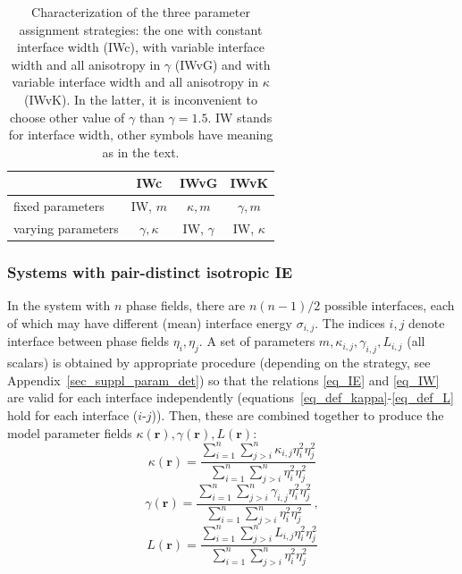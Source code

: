	\begin{table}[h]
		\centering
		\caption[PF model - characterization of the three parameter assignment strategies]{Characterization of the three parameter assignment strategies: the one with constant interface width (IWc), with variable interface width and all anisotropy in $\gamma$ (IWvG) and with variable interface width and all anisotropy in $\kappa$ (IWvK). In the latter, it is inconvenient to choose other value of $\gamma$ than $\gamma=1.5$. IW stands for interface width, other symbols have meaning as in the text.}
		\label{tab_models_comparison}
		\begin{tabular}{l|c|c|c|}\footnotesize
			& IWc & IWvG & IWvK \\ \hline
			fixed parameters & IW, $m$ & $\kappa, m$ & $\gamma, m$  \\
			varying parameters & $\gamma, \kappa$ & IW, $\gamma$ & IW, $\kappa$
		\end{tabular}
	\end{table}

		\subsubsection{Systems with pair-distinct isotropic IE}
		In the system with $n$ phase fields, there are $n(n-1)/2$ possible interfaces, each of which may have different (mean) interface energy $\sigma_{i,j}$. The indices $i,j$ denote interface between phase fields $\eta_i,\eta_j$. A set of parameters $m,\kappa_{i,j},\gamma_{i,j}, L_{i,j}$ (all scalars) is obtained by appropriate procedure  (depending on the strategy, see Appendix~\ref{sec_suppl_param_det}) so that the relations \eqref{eq_IE} and \eqref{eq_IW} are valid for each interface independently (equations~\eqref{eq_def_kappa}-\eqref{eq_def_L} hold for each interface ($i$-$j$)). Then, these are combined together to produce the model parameter fields $\kappa(\bm{r}),\gamma(\bm{r}),L(\bm{r})$:
		\begin{equation}
			\kappa(\bm{r}) = \frac{\sum_{i=1}^n\sum_{j>i}^n\kappa_{i,j}\eta_i^2\eta_j^2}{\sum_{i=1}^n\sum_{j>i}^n\eta_i^2\eta_j^2}
		\end{equation}
		\begin{equation}
			\gamma(\bm{r}) = \frac{\sum_{i=1}^n\sum_{j>i}^n\gamma_{i,j}\eta_i^2\eta_j^2}{\sum_{i=1}^n\sum_{j>i}^n\eta_i^2\eta_j^2} \,,
		\end{equation}
		\begin{equation}
			L(\bm{r})= \frac{\sum_{i=1}^n\sum_{j>i}^nL_{i,j}\eta_i^2\eta_j^2}{\sum_{i=1}^n\sum_{j>i}^n\eta_i^2\eta_j^2}
		\end{equation}
		
